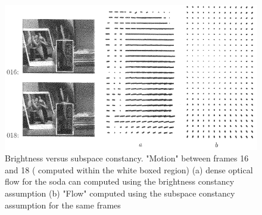 								\begin{figure}[t]
								\center
								\includegraphics[width=1.0\textwidth]{thesis/TrackingPapers_SubspaceTracking_1998_Black_fig11_nocaption.png}
								\caption{Brightness versus subspace constancy.  "Motion" between frames 16 and 18 ( computed within the white boxed region) (a) dense optical flow for the soda can computed using the brightness constancy assumption (b) "Flow" computed using the subspace constancy assumption for the same frames \cite{1998_JNL_Eigentracking_Black}}
								\end{figure}


